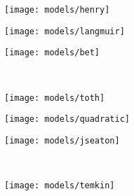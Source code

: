 \begin{figure}[p!]
    \centering

    \begin{subfigure}{0.3\linewidth}
        \parbox[c]{0.1\linewidth}{\caption{}%
            \label{fgr:pyg:henryex}}
        \parbox[b]{0.7\linewidth}{%
            \texttt{[image: models/henry]}}
    \end{subfigure}
    \begin{subfigure}{0.3\linewidth}
        \parbox[c]{0.1\linewidth}{\caption{}%
            \label{fgr:pyg:langmuirex}}
        \parbox[b]{0.7\linewidth}{%
            \texttt{[image: models/langmuir]}}
    \end{subfigure}
    \begin{subfigure}{0.3\linewidth}
        \parbox[c]{0.1\linewidth}{\caption{}%
            \label{fgr:pyg:betex}}
        \parbox[b]{0.7\linewidth}{%
            \texttt{[image: models/bet]}}
    \end{subfigure}
    \\
    \begin{subfigure}{0.3\linewidth}
        \parbox[c]{0.1\linewidth}{\caption{}%
            \label{fgr:pyg:tothex}}
        \parbox[b]{0.7\linewidth}{%
            \texttt{[image: models/toth]}}
    \end{subfigure}
    \begin{subfigure}{0.3\linewidth}
        \parbox[c]{0.1\linewidth}{\caption{}%
            \label{fgr:pyg:quadraticex}}
        \parbox[b]{0.7\linewidth}{%
            \texttt{[image: models/quadratic]}}
    \end{subfigure}
    \begin{subfigure}{0.3\linewidth}
        \parbox[c]{0.1\linewidth}{\caption{}%
            \label{fgr:pyg:jseatonex}}
        \parbox[b]{0.7\linewidth}{%
            \texttt{[image: models/jseaton]}}
    \end{subfigure}
    \\
    \begin{subfigure}{0.3\linewidth}
        \parbox[c]{0.1\linewidth}{\caption{}%
            \label{fgr:pyg:temkinex}}
        \parbox[b]{0.7\linewidth}{%
            \texttt{[image: models/temkin]}}
    \end{subfigure}
    \begin{subfigure}{0.3\linewidth}
        \parbox[c]{0.1\linewidth}{\caption{}%
            \label{fgr:pyg:virialex}}

\end{subfigure}
\end{figure}
